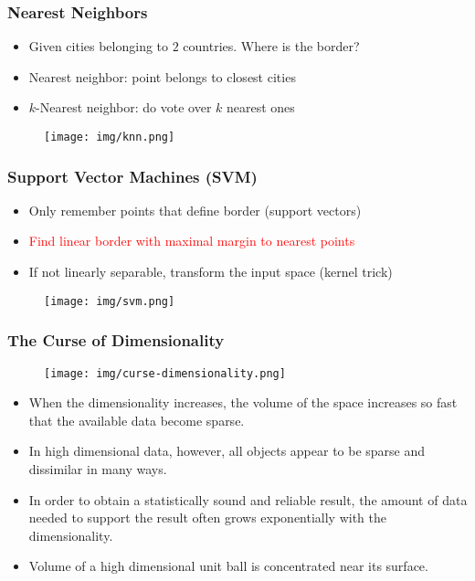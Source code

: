 \documentclass[UTF8,11pt,colorlinks,compress,openany]{beamer}%
\begin{document}
\begin{frame}\frametitle{Nearest Neighbors}
\begin{itemize}
	\item Given cities belonging to $2$ countries. Where is the border?
	\item Nearest neighbor: point belongs to closest cities
	\item $k$-Nearest neighbor: do vote over $k$ nearest ones
\end{itemize}
\begin{figure}[H]
\texttt{[image: img/knn.png]}	
\end{figure}
\end{frame}

\begin{frame}\frametitle{Support Vector Machines (SVM)}
\begin{itemize}
	\item Only remember points that define border (support vectors)
	\item \textcolor{red}{Find linear border with maximal margin to nearest points}
	\item If not linearly separable, transform the input space (kernel trick)
\end{itemize}
\begin{figure}[H]
\texttt{[image: img/svm.png]}	
\end{figure}
\end{frame}

\begin{frame}\frametitle{The Curse of Dimensionality}
\begin{figure}[H]
\texttt{[image: img/curse-dimensionality.png]}
\end{figure}
\begin{itemize}
	\item When the dimensionality increases, the volume of the space increases so fast that the available data become sparse.
	\item In high dimensional data, however, all objects appear to be sparse and dissimilar in many ways.
	\item In order to obtain a statistically sound and reliable result, the amount of data needed to support the result often grows exponentially with the dimensionality.
	\item Volume of a high dimensional unit ball is concentrated near its surface.
\end{itemize}
\end{frame}
\end{document}
